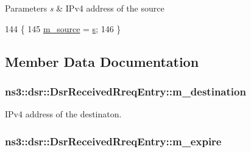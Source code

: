 \begin{DoxyParams}{Parameters}
{\em s} & I\+Pv4 address of the source \\
\hline
\end{DoxyParams}

\begin{DoxyCode}
144   \{
145     \hyperlink{classns3_1_1dsr_1_1DsrReceivedRreqEntry_a374722e0a90fd8d76dd392e7a0a2398e}{m\_source} = \hyperlink{generate__test__data__lte__sinr_8m_ad83eeb3a142285d1243a08c6b7026df8}{s};
146   \}
\end{DoxyCode}


\subsection{Member Data Documentation}
\subsubsection[{\texorpdfstring{m\+\_\+destination}{m_destination}}]{ ns3\+::dsr\+::\+Dsr\+Received\+Rreq\+Entry\+::m\+\_\+destination\hspace{0.3cm}{\ttfamily [private]}}\hypertarget{classns3_1_1dsr_1_1DsrReceivedRreqEntry_ad0389b4b039801edb2dfd28bec6163a4}{}\label{classns3_1_1dsr_1_1DsrReceivedRreqEntry_ad0389b4b039801edb2dfd28bec6163a4}


I\+Pv4 address of the destinaton. 

\subsubsection[{\texorpdfstring{m\+\_\+expire}{m_expire}}]{ ns3\+::dsr\+::\+Dsr\+Received\+Rreq\+Entry\+::m\+\_\+expire\hspace{0.3cm}{\ttfamily [private]}}\hypertarget{classns3_1_1dsr_1_1DsrReceivedRreqEntry_aa5ec328db5e19bccccd083ae6b91e91f}{}\label{classns3_1_1dsr_1_1DsrReceivedRreqEntry_aa5ec328db5e19bccccd083ae6b91e91f}



